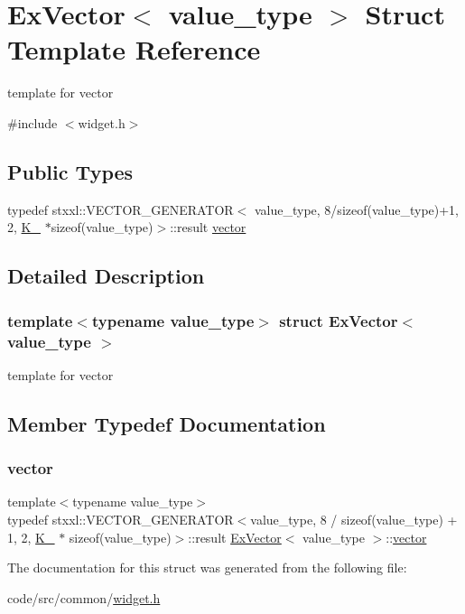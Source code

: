 \hypertarget{struct_ex_vector}{}\section{Ex\+Vector$<$ value\+\_\+type $>$ Struct Template Reference}
\label{struct_ex_vector}


template for vector  




{\ttfamily \#include $<$widget.\+h$>$}

\subsection*{Public Types}
\begin{DoxyCompactItemize}
\item 
typedef stxxl\+::\+V\+E\+C\+T\+O\+R\+\_\+\+G\+E\+N\+E\+R\+A\+T\+OR$<$ value\+\_\+type, 8/sizeof(value\+\_\+type)+1, 2, \hyperlink{common_8h_a4b1a49a5378e8e0c9aca7501041c8d6d}{K\+\_} $\ast$sizeof(value\+\_\+type)$>$\+::result \hyperlink{struct_ex_vector_aa45a4c6039859d71d03827b07d265287}{vector}
\end{DoxyCompactItemize}


\subsection{Detailed Description}
\subsubsection*{template$<$typename value\+\_\+type$>$\newline
struct Ex\+Vector$<$ value\+\_\+type $>$}

template for vector 

\subsection{Member Typedef Documentation}
\mbox{\label{struct_ex_vector_aa45a4c6039859d71d03827b07d265287}} 
\subsubsection{\texorpdfstring{vector}{vector}}
{\footnotesize\ttfamily template$<$typename value\+\_\+type$>$ \\
typedef stxxl\+::\+V\+E\+C\+T\+O\+R\+\_\+\+G\+E\+N\+E\+R\+A\+T\+OR$<$value\+\_\+type, 8 / sizeof(value\+\_\+type) + 1, 2, \hyperlink{common_8h_a4b1a49a5378e8e0c9aca7501041c8d6d}{K\+\_} $\ast$ sizeof(value\+\_\+type)$>$\+::result \hyperlink{struct_ex_vector}{Ex\+Vector}$<$ value\+\_\+type $>$\+::\hyperlink{struct_ex_vector_aa45a4c6039859d71d03827b07d265287}{vector}}



The documentation for this struct was generated from the following file\+:\begin{DoxyCompactItemize}
\item 
code/src/common/\hyperlink{widget_8h}{widget.\+h}\end{DoxyCompactItemize}

